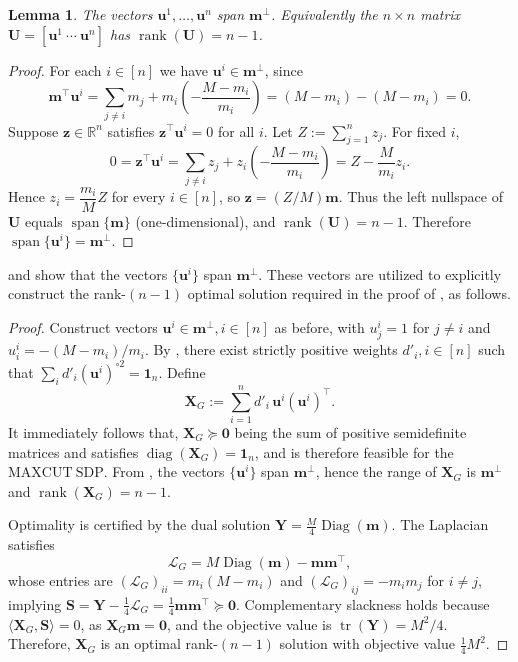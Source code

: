 \documentclass[a4paper,fleqn]{cas-sc}
\newcommand{\X}{\mathbf{X}}
\renewcommand{\L}{\mathcal{L}}
\newcommand{\1}{\mathbf{1}}
\newcommand{\bz}{\mathbf{0}}
\newcommand{\bS}{\mathbf{S}}
\newcommand{\Y}{\mathbf{Y}}
\newcommand{\bu}{\mathbf{u}}
\newcommand{\bm}{\mathbf{m}}
\newtheorem{lemma}[theorem]{Lemma}
\DeclareMathOperator{\tr}{tr}
\begin{document}
\begin{lemma}\label{lem3}
The vectors \(\bu^1,\dots,\bu^n\) span \(\bm^{\perp}\). Equivalently the \(n\times n\) matrix \(\mathbf{U}=[\bu^1\ \cdots\ \bu^n]\) has \(\operatorname{rank}(\mathbf{U})=n-1\).
\end{lemma}

\begin{proof}

For each $i \in [n]$ we have $\bu^i \in \bm^{\perp}$, since
\[
\bm^{\top} \bu^i = \sum_{j\ne i} m_j + m_i\left(-\frac{M-m_i}{m_i}\right) = (M-m_i) - (M-m_i)=0.
\]
Suppose \(\mathbf{z}\in\mathbb R^n\) satisfies \(\mathbf{z}^\top \bu^i=0\) for all \(i\). Let \(Z:=\sum_{j=1}^n z_j\). For fixed \(i\),
\[
0 = \mathbf{z}^\top \bu^i = \sum_{j\ne i} z_j + z_i\left(-\frac{M-m_i}{m_i}\right)
= Z - \frac{M}{m_i} z_i.
\]
Hence \(z_i = \dfrac{m_i}{M}Z\) for every \(i \in [n]\), so \(\mathbf z=(Z/M)\bm\). Thus the left nullspace of \(\mathbf{U}\) equals \(\operatorname{span}\{\bm\}\) (one-dimensional), and \(\operatorname{rank}(\mathbf{U})=n-1\). Therefore \(\operatorname{span}\{\bu^i\}=\bm^\perp\).
\end{proof}

 and  show that the vectors $\{\bu^i\}$ span $\bm^\perp$. These vectors are utilized to explicitly construct the rank-$(n-1)$ optimal solution required in the proof of , as follows.

\begin{proof}
Construct vectors $\bu^i\in \bm^\perp, i \in [n]$ as before, with $u^i_j=1$ for $j\neq i$ and $u^i_i=-(M-m_i)/m_i$. By , there exist strictly positive weights $d'_i, i \in [n]$ such that $\sum_i d'_i (\bu^i)^{\circ2}=\1_n$. Define
\[
\X_G := \sum_{i=1}^n d'_i\, \bu^i (\bu^i)^\top.
\]
It immediately follows that, $\X_G \succeq \bz$  being the sum of positive semidefinite matrices and satisfies $\operatorname{diag}(\X_G)=\1_n$, and is therefore feasible for the $\mathrm{MAXCUT\ SDP}$. From , the vectors $\{\bu^i\}$ span $\bm^\perp$, hence the range of $\X_G$ is $\bm^\perp$ and $\operatorname{rank}(\X_G)=n-1$.

Optimality is certified by the dual solution $\Y = \tfrac M4 \operatorname{Diag}(\bm)$. The Laplacian satisfies 
\begin{equation*}
\L_{G} = M\operatorname{Diag}(\bm) - \bm \bm{^\top},  
\end{equation*}
whose entries are $(\L_{G})_{ii} = m_i(M - m_i)$ and $(\L_{G})_{ij} = -m_i m_j$ for $i \neq j$, implying $\bS = \Y - \tfrac14 \L_{G} = \tfrac14 \bm \bm{^\top} \succeq \bz$. Complementary slackness holds because $\langle \X_G, \bS \rangle = 0$, as $\X_G \bm = \bz$, and the objective value is $\tr(\Y) = M^2 / 4$. Therefore, $\X_G$ is an optimal rank-$(n-1)$ solution with objective value $\tfrac14 M^2$.
\end{proof}
\end{document}
